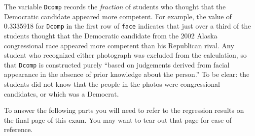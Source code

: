 \documentclass[addpoints,12pt]{exam}
\begin{document}
\begin{questions}
The variable \texttt{Dcomp} records the \emph{fraction} of students who thought that the Democratic candidate appeared more competent.
For example, the value of 0.3335918 for \texttt{Dcomp} in the first row of \texttt{face} indicates that just over a third of the students thought that the Democratic candidate from the 2002 Alaska congressional race appeared more competent than his Republican rival.
Any student who recognized either photograph was excluded from the calculation, so that \texttt{Dcomp} is constructed purely ``based on judgements derived from facial appearance in the absence of prior knowledge about the person.''
To be clear: the students did not know that the people in the photos were congressional candidates, or which was a Democrat.

\newpage

To answer the following parts you will need to refer to the regression results on the final page of this exam.
You may want to tear out that page for ease of reference.
\end{questions}
\end{document}
